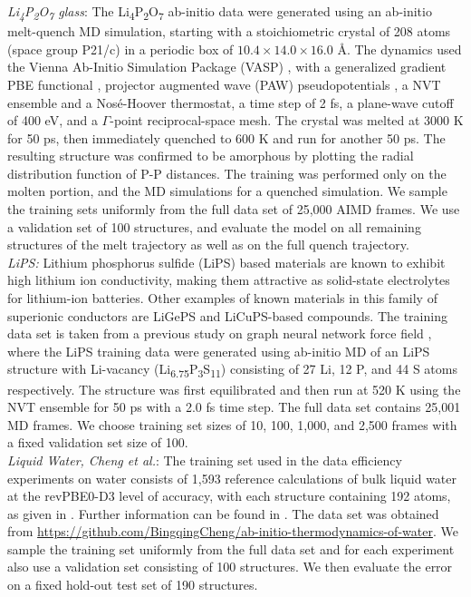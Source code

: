 \documentclass[%
reprint,
superscriptaddress,
nofootinbib,
amsmath,amssymb,
aps,
prl,
]{revtex4-1}
\begin{document}
\textit{Li\textsubscript{4}P\textsubscript{2}O\textsubscript{7} glass}: The Li\textsubscript{4}P\textsubscript{2}O\textsubscript{7} ab-initio data were generated using an ab-initio melt-quench MD simulation, starting with a stoichiometric crystal of 208 atoms (space group P21/c) in a periodic box of $10.4 \times 14.0 \times 16.0$ \AA.
The dynamics used the Vienna Ab-Initio Simulation Package (VASP) \cite{vasp1,vasp2,vasp3},
with a generalized gradient PBE functional \cite{PBE}, projector augmented wave (PAW)
pseudopotentials \cite{PAW},
a NVT ensemble and a Nos\'e-Hoover thermostat,
a time step of 2 fs,
a plane-wave cutoff of 400 eV,
and a $\Gamma$-point reciprocal-space mesh.
The crystal was melted at 3000 K for 50 ps, then immediately quenched to 600 K and run for another 50 ps. The resulting structure was confirmed to be amorphous by plotting the radial distribution function of P-P distances.
The training was performed only on the molten portion, and the MD simulations for a quenched simulation. We sample the training sets uniformly from the full data set of 25,000 AIMD frames. We use a validation set of 100 structures, and evaluate the model on all remaining structures of the melt trajectory as well as on the full quench trajectory.\\

\textit{LiPS:} Lithium phosphorus sulfide (LiPS) based materials are known to exhibit high lithium ion conductivity, making them attractive as solid-state electrolytes for lithium-ion batteries. Other examples of known materials in this family of superionic conductors are LiGePS and LiCuPS-based compounds. The training data set is taken from a previous study on graph neural network force field \cite{gnnff}, where the LiPS training data were generated using ab-initio MD of an LiPS structure with Li-vacancy (Li\textsubscript{6.75}P\textsubscript{3}S\textsubscript{11}) consisting of 27 Li, 12 P, and 44 S atoms respectively. The structure was first equilibrated and then run at 520 K using the NVT ensemble for 50 ps with a 2.0 fs time step. The full data set contains 25,001 MD frames. We choose training set sizes of 10, 100, 1,000, and 2,500 frames with a fixed validation set size of 100. \\

\textit{Liquid Water, Cheng et al.}: The training set used in the data efficiency experiments on water consists of 1,593 reference calculations of bulk liquid water at the revPBE0-D3 level of accuracy, with each structure containing 192 atoms, as given in \cite{cheng2019ab}. Further information can be found in \cite{cheng2019ab}. The data set was obtained from \url{https://github.com/BingqingCheng/ab-initio-thermodynamics-of-water}. We sample the training set uniformly from the full data set and for each experiment also use a validation set consisting of 100 structures. We then evaluate the error on a fixed hold-out test set of 190 structures.\\
\end{document}

